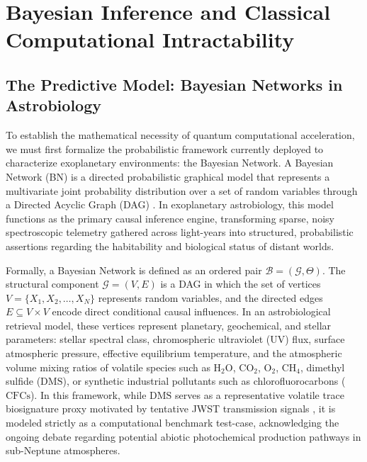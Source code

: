 \chapter{Bayesian Inference and Classical Computational Intractability}\label{chap:classical_limits}

\section{The Predictive Model: Bayesian Networks in Astrobiology}\label{sec:predictive_model_bn}

To establish the mathematical necessity of quantum computational acceleration, we must first formalize the probabilistic framework currently deployed to characterize exoplanetary environments: the Bayesian Network. A Bayesian Network (BN) is a directed probabilistic graphical model that represents a multivariate joint probability distribution over a set of random variables through a Directed Acyclic Graph (DAG) \cite{pearl1988}. In exoplanetary astrobiology, this model functions as the primary causal inference engine, transforming sparse, noisy spectroscopic telemetry gathered across light-years into structured, probabilistic assertions regarding the habitability and biological status of distant worlds.

Formally, a Bayesian Network is defined as an ordered pair $\mathcal{B} = (\mathcal{G}, \Theta)$. The structural component $\mathcal{G} = (V, E)$ is a DAG in which the set of vertices $V = \{X_1, X_2, \dots, X_N\}$ represents random variables, and the directed edges $E \subseteq V \times V$ encode direct conditional causal influences. In an astrobiological retrieval model, these vertices represent planetary, geochemical, and stellar parameters: stellar spectral class, chromospheric ultraviolet (UV) flux, surface atmospheric pressure, effective equilibrium temperature, and the atmospheric volume mixing ratios of volatile species such as $\mathrm{H}_2\mathrm{O}$, $\mathrm{CO}_2$, $\mathrm{O}_2$, $\mathrm{CH}_4$, dimethyl sulfide ($\mathrm{DMS}$), or synthetic industrial pollutants such as chlorofluorocarbons ($\mathrm{CFCs}$). In this framework, while $\mathrm{DMS}$ serves as a representative volatile trace biosignature proxy motivated by tentative JWST transmission signals \cite{madhusudhan2023}, it is modeled strictly as a computational benchmark test-case, acknowledging the ongoing debate regarding potential abiotic photochemical production pathways in sub-Neptune atmospheres.

